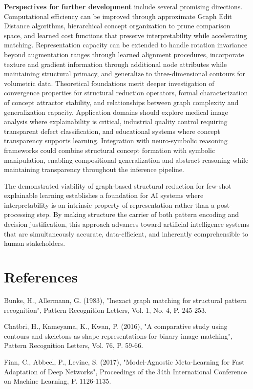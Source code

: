\documentclass[a4paper,10pt]{article}
\begin{document}
\textbf{Perspectives for further development} include several promising directions. Computational efficiency can be improved through approximate Graph Edit Distance algorithms, hierarchical concept organization to prune comparison space, and learned cost functions that preserve interpretability while accelerating matching. Representation capacity can be extended to handle rotation invariance beyond augmentation ranges through learned alignment procedures, incorporate texture and gradient information through additional node attributes while maintaining structural primacy, and generalize to three-dimensional contours for volumetric data. Theoretical foundations merit deeper investigation of convergence properties for structural reduction operators, formal characterization of concept attractor stability, and relationships between graph complexity and generalization capacity. Application domains should explore medical image analysis where explainability is critical, industrial quality control requiring transparent defect classification, and educational systems where concept transparency supports learning. Integration with neuro-symbolic reasoning frameworks could combine structural concept formation with symbolic manipulation, enabling compositional generalization and abstract reasoning while maintaining transparency throughout the inference pipeline.

The demonstrated viability of graph-based structural reduction for few-shot explainable learning establishes a foundation for AI systems where interpretability is an intrinsic property of representation rather than a post-processing step. By making structure the carrier of both pattern encoding and decision justification, this approach advances toward artificial intelligence systems that are simultaneously accurate, data-efficient, and inherently comprehensible to human stakeholders.

\section{References}

Bunke, H., Allermann, G. (1983), "Inexact graph matching for structural pattern recognition", Pattern Recognition Letters, Vol. 1, No. 4, P. 245-253.

Chatbri, H., Kameyama, K., Kwan, P. (2016), "A comparative study using contours and skeletons as shape representations for binary image matching", Pattern Recognition Letters, Vol. 76, P. 59-66.

Finn, C., Abbeel, P., Levine, S. (2017), "Model-Agnostic Meta-Learning for Fast Adaptation of Deep Networks", Proceedings of the 34th International Conference on Machine Learning, P. 1126-1135.
\end{document}
